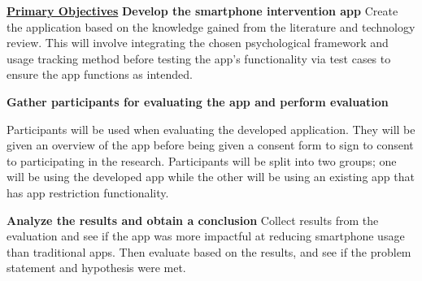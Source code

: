 \documentclass[12pt]{article}
\begin{document}


\noindent\underline{\textbf{Primary Objectives}}\newline\newline
\noindent\textbf{Develop the smartphone intervention app}\newline
Create the application based on the knowledge gained from the literature and technology review. This will involve
integrating the chosen psychological framework and usage tracking method before testing the app's functionality
via test cases to ensure the app functions as intended.  \newline

\noindent\textbf{Gather participants for evaluating the app and perform evaluation}\newline

Participants will be used when evaluating the developed application. They will be given an overview of the app 
before being given a consent form to sign to consent to participating in the research. Participants will be split 
into two groups; one will be using the developed app while the other will be using an existing app that has app 
restriction functionality. \newline %


\noindent\textbf{Analyze the results and obtain a conclusion}\newline
Collect results from the evaluation and see if the app was more impactful at reducing smartphone usage than 
traditional apps. Then evaluate based on the results, and see if the problem statement and
hypothesis were met.\newline 
\end{document}
